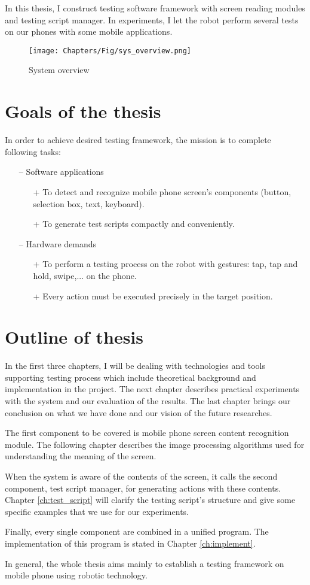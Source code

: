 In this thesis, I construct testing software framework with screen reading modules and testing script manager. In experiments, I let the robot perform several tests on our phones with some mobile applications.

	\begin{figure}
		\centering
		\texttt{[image: Chapters/Fig/sys\_overview.png]}
		\caption{System overview}
		\label{fig:sys_overview}
	\end{figure}

\section{Goals of the thesis}
In order to achieve desired testing framework, the mission is to complete following tasks:
	\begin{itemize}
		\item[--] Software applications
        	\begin{itemize}
				\item[+] To detect and recognize mobile phone screen's components (button, selection box, text, keyboard).
				\item[+] To generate test scripts compactly and conveniently.
			\end{itemize}
		\item[--] Hardware demands
        	\begin{itemize}
				\item[+] To perform a testing process on the robot with gestures: tap, tap and hold, swipe,... on the phone.
				\item[+] Every action must be executed precisely in the target position.
			\end{itemize}
	\end{itemize}

\section{Outline of thesis}
In the first three chapters, I will be dealing with technologies and tools supporting testing process which include theoretical background and implementation in the project. The next chapter describes practical experiments with the system and our evaluation of the results. The last chapter brings our conclusion on what we have done and our vision of the future researches.

The first component to be covered is mobile phone screen content recognition module. The following chapter describes the image processing algorithms used for understanding the meaning of the screen. 

When the system is aware of the contents of the screen, it calls the second component, test script manager, for generating actions with these contents. Chapter \ref{ch:test_script} will clarify the testing script's structure and give some specific examples that we use for our experiments.

Finally, every single component are combined in a unified program. The implementation of this program is stated in Chapter \ref{ch:implement}.

In general, the whole thesis aims mainly to establish a testing framework on mobile phone using robotic technology. \nocite{radim_thesis}
